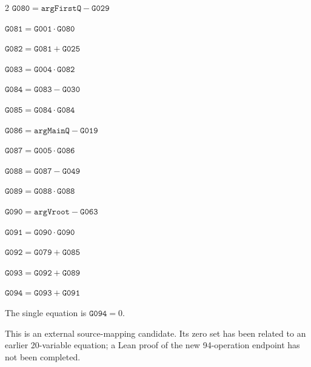 \documentclass[10pt]{article}
\begin{document}
\begin{multicols}{2}
\noindent $\mathtt{G080}=\mathtt{argFirstQ}-\mathtt{G029}$\par
\noindent $\mathtt{G081}=\mathtt{G001}\cdot \mathtt{G080}$\par
\noindent $\mathtt{G082}=\mathtt{G081}+\mathtt{G025}$\par
\noindent $\mathtt{G083}=\mathtt{G004}\cdot \mathtt{G082}$\par
\noindent $\mathtt{G084}=\mathtt{G083}-\mathtt{G030}$\par
\noindent $\mathtt{G085}=\mathtt{G084}\cdot \mathtt{G084}$\par
\noindent $\mathtt{G086}=\mathtt{argMainQ}-\mathtt{G019}$\par
\noindent $\mathtt{G087}=\mathtt{G005}\cdot \mathtt{G086}$\par
\noindent $\mathtt{G088}=\mathtt{G087}-\mathtt{G049}$\par
\noindent $\mathtt{G089}=\mathtt{G088}\cdot \mathtt{G088}$\par
\noindent $\mathtt{G090}=\mathtt{argVroot}-\mathtt{G063}$\par
\noindent $\mathtt{G091}=\mathtt{G090}\cdot \mathtt{G090}$\par
\noindent $\mathtt{G092}=\mathtt{G079}+\mathtt{G085}$\par
\noindent $\mathtt{G093}=\mathtt{G092}+\mathtt{G089}$\par
\noindent $\mathtt{G094}=\mathtt{G093}+\mathtt{G091}$\par
\end{multicols}
\noindent The single equation is $\boxed{\mathtt{G094}=0}$.
\par\medskip
This is an external source-mapping candidate. Its zero set has been related to
an earlier 20-variable equation; a Lean proof of the new 94-operation endpoint
has not been completed.
\bigskip
\end{document}
